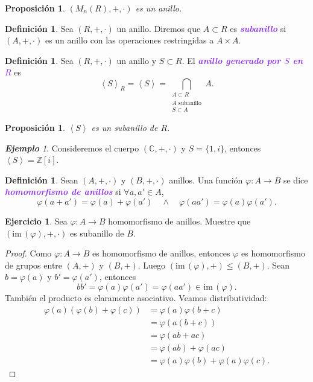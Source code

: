 \documentclass{article}
\newtheorem{proposition}[theorem]{Proposición}
\theoremstyle{definition}
\newtheorem{definition}[theorem]{Definición}
\newtheorem{exercise}{Ejercicio}
\theoremstyle{remark}
\newtheorem{example}[theorem]{\textbf{Ejemplo}}
\numberwithin{equation}{section}
\newcommand{\C}{\mathbb{C}}
\newcommand{\Z}{\mathbb{Z}}
\newcommand{\vphi}{\varphi}
\renewcommand{\c}{\cdot}
\newcommand{\im}{\mathrm{im}\,}
\newcommand{\gen}[1]{\left\langle #1 \right\rangle}
\newcommand{\wea}[1]{\textcolor{BlueViolet}{\textbf{\emph{#1}}}}
\begin{document}
\begin{proposition}
  $(M_n(R),+,\c)$ es un anillo.
\end{proposition}

\begin{definition}
  Sea $(R,+,\c)$ un anillo. Diremos que $A \subset R$ es \wea{subanillo} si $(A,+, \c)$ es un anillo con las operaciones restringidas a $A \times A$.
\end{definition}

\begin{definition}
  Sea $(R,+,\c)$ un anillo y $S \subset R$. El \wea{anillo generado por $S$ en $R$} es 
  \[ \gen{S}_R = \gen{S} = \bigcap_{\substack{A \subset R \\ A \text{ subanillo} \\ S \subset A}} A. \]
\end{definition}

\begin{proposition}
  $\gen{S}$ es un subanillo de $R$.
\end{proposition}

\begin{example}
  Consideremos el cuerpo $(\C,+,\c)$ y $S = \{1,i\}$, entonces $\gen{S} = \Z[i]$.
\end{example}

\begin{definition}
  Sean $(A,+,\c)$ y $(B,+,\c)$ anillos. Una función $\vphi \colon A \to B$ se dice \wea{homomorfismo de anillos} si $\forall a,a' \in A$, 
  \[ \vphi(a+a') = \vphi(a) + \vphi(a') \quad\land\quad \vphi(aa') = \vphi(a) \vphi(a'). \]
\end{definition}

\begin{exercise}
  Sea $\vphi \colon A \to B$ homomorfismo de anillos. Muestre que $(\im(\vphi),+,\c)$ es subanillo de $B$.
\end{exercise}
\begin{proof}
  Como $\vphi \colon A \to B$ es homomorfismo de anillos, entonces $\vphi$ es homomorfismo de grupos entre $(A,+)$ y $(B,+)$. Luego $(\im(\vphi),+) \leqslant (B,+)$. Sean $b = \vphi(a)$ y $b' = \vphi(a')$, entonces 
  \[ bb' = \vphi(a) \vphi(a') = \vphi(aa') \in \im(\vphi). \]
  También el producto es claramente asociativo. Veamos distributividad: 
  \begin{align*}
      \vphi(a)(\vphi(b) + \vphi(c))
      &= \vphi(a)\vphi(b+c) \\
      &= \vphi(a(b+c)) \\
      &= \vphi(ab + ac) \\
      &= \vphi(ab) + \vphi(ac) \\
      &= \vphi(a)\vphi(b) + \vphi(a) \vphi(c).
  \end{align*}
\end{proof}
\end{document}
